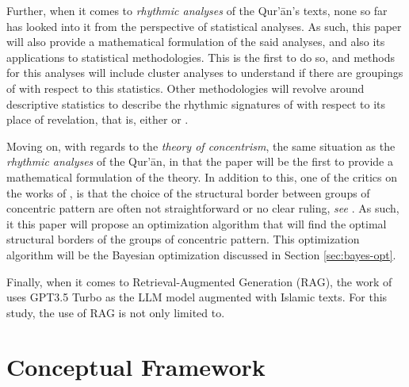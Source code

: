 Further, when it comes to \textit{rhythmic analyses} of the Qur'\=an's texts, none so far has looked into it from the perspective of statistical analyses. As such, this paper will also provide a mathematical formulation of the said analyses, and also its applications to statistical methodologies. This is the first to do so, and methods for this analyses will include cluster analyses to understand if there are groupings of   with respect to this statistics. Other methodologies will revolve around descriptive statistics to describe the rhythmic signatures of   with respect to its place of revelation, that is, either   or  .

Moving on, with regards to the \textit{theory of concentrism}, the same situation as the \textit{rhythmic analyses} of the Qur'\=an, in that the paper will be the first to provide a mathematical formulation of the theory. In addition to this, one of the critics on the works of , is that the choice of the structural border between groups of concentric pattern are often not straightforward or no clear ruling, \textit{see} . As such, it this paper will propose an optimization algorithm that will find the optimal structural borders of the groups of concentric pattern. This optimization algorithm will be the Bayesian optimization discussed in Section \ref{sec:bayes-opt}.

Finally, when it comes to Retrieval-Augmented Generation (RAG), the work of  uses GPT3.5 Turbo as the LLM model augmented with Islamic texts. For this study, the use of RAG is not only limited to.


\section{Conceptual Framework}